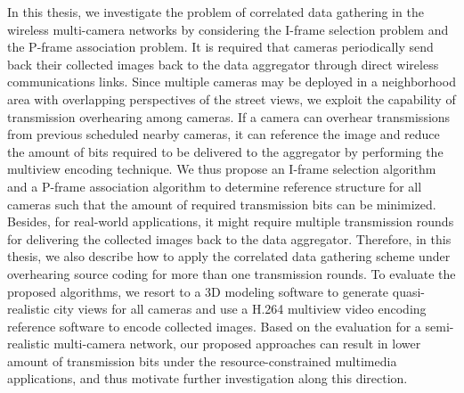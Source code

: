 In this thesis, we investigate the problem of correlated data gathering in the wireless multi-camera networks by considering the I-frame selection problem and the P-frame association problem.
It is required that cameras periodically send back their collected images back to the data aggregator through direct wireless communications links.
Since multiple cameras may be deployed in a neighborhood area with overlapping perspectives of the street views, we exploit the capability of transmission overhearing among cameras.
If a camera can overhear transmissions from previous scheduled nearby cameras, it can reference the image and reduce the amount of bits required to be delivered to the aggregator by performing the multiview encoding technique.
We thus propose an I-frame selection algorithm and a P-frame association algorithm to determine reference structure for all cameras such that the amount of required transmission bits can be minimized.
Besides, for real-world applications, it might require multiple transmission rounds for delivering the collected images back to the data aggregator.
Therefore, in this thesis, we also describe how to apply the correlated data gathering scheme under overhearing source coding for more than one transmission rounds.
To evaluate the proposed algorithms, we resort to a 3D modeling software to generate quasi-realistic city views for all cameras and use a H.264 multiview video encoding reference software to encode collected images.
Based on the evaluation for a semi-realistic multi-camera network, our proposed approaches can result in lower amount of transmission bits under the resource-constrained multimedia applications, and thus motivate further investigation along this direction.